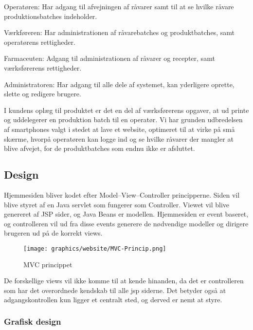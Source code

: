 \documentclass[a4paper]{article}
\newenvironment{my_itemize}
{\begin{itemize}
  \setlength{\itemsep}{1pt}
  \setlength{\parskip}{0pt}
  \setlength{\parsep}{0pt}}
{\end{itemize}}
\newenvironment{changemargin}[2]{%
\begin{list}{}{%
\setlength{\topsep}{0pt}%
\setlength{\leftmargin}{#1}%
\setlength{\rightmargin}{#2}%
\setlength{\listparindent}{\parindent}%
\setlength{\itemindent}{\parindent}%
\setlength{\parsep}{\parskip}%
}%
\item[]}{\end{list}}
\begin{document}
\begin{my_itemize}
  \item Operatøren: Har adgang til afvejningen af råvarer samt til at se hvilke råvare produktionsbatches indeholder.
  \item Værkføreren: Har administrationen af råvarebatches og produktbatches, samt operatørens rettigheder.
  \item Farmaceuten: Adgang til administrationen af råvarer og recepter, samt værksførerens rettigheder. 
  \item Administratoren: Har adgang til alle dele af systemet, kan yderligere oprette, slette og redigere brugere.
\end{my_itemize}

I kundens oplæg til produktet er det en del af værksførerens opgaver, at ud printe og uddelegerer en produktion batch til en operatør. Vi har grunden udbredelsen af smartphones valgt i stedet at lave et website, optimeret til at virke på små skærme, hvorpå operatøren kan logge ind og se hvilke råvarer der mangler at blive afvejet, for de produktbatches som endnu ikke er afsluttet.


\subsection{Design} %

Hjemmesiden bliver kodet efter Model–View–Controller principperne. Siden vil blive styret af en Java servlet som fungerer som Controller. Viewet vil blive genereret af JSP sider, og Java Beans er modellen.  Hjemmesiden er event baseret, og controlleren vil ud fra disse events generere de nødvendige modeller og dirigere brugeren ud på de korrekt views.

\begin{figure}[h!]
\begin{changemargin}{-2cm}{-2cm}
  \centering
  \texttt{[image: graphics/website/MVC-Princip.png]}
  \caption{MVC princippet}
\end{changemargin}
\end{figure}


De forskellige views vil ikke komme til at kende hinanden, da det er controlleren som har det overordnede kendskab til alle jsp siderne. Det betyder også at adgangskontrollen kun ligger et centralt sted, og derved er nemt at styre.

\subsubsection{Grafisk design} %
\end{document}

